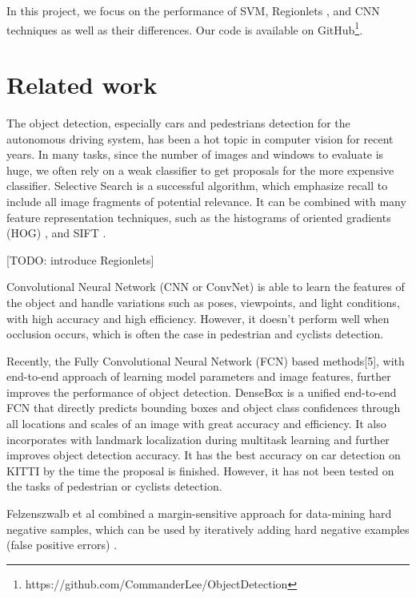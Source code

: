 \documentclass{article} %
\begin{document}
In this project, we focus on the performance of SVM, Regionlets \cite{Wang2013}, and CNN techniques as well as their differences. Our code is available on GitHub\footnote{https://github.com/CommanderLee/ObjectDetection}.


\section{Related work}

The object detection, especially cars and pedestrians detection for the autonomous driving system, has been a hot topic in computer vision for recent years. In many tasks, since the number of images and windows to evaluate is huge, we often rely on a weak classifier to get proposals for the more expensive classifier. Selective Search \cite{van2011segmentation} is a successful algorithm, which emphasize recall to include all image fragments of potential relevance. It can be combined with many feature representation techniques, such as the histograms of oriented gradients (HOG) \cite{dalal2005histograms}, and SIFT \cite{lowe2004distinctive}. 

[TODO: introduce Regionlets]

Convolutional Neural Network (CNN or ConvNet) \cite{Krizhevsky2012} is able to learn the features of the object and handle variations such as poses, viewpoints, and light conditions, with high accuracy and high efficiency. However, it doesn't perform well when occlusion occurs, which is often the case in pedestrian and cyclists detection. 

Recently, the Fully Convolutional Neural Network (FCN) based methods[5], with end-to-end approach of learning model parameters and image features, further improves the performance of object detection. DenseBox \cite{Huang2015} is a unified end-to-end FCN that
directly predicts bounding boxes and object class confidences through all locations
and scales of an image with great accuracy and efficiency. It also incorporates with landmark localization during multitask learning and further improves
object detection accuracy. It has the best accuracy on car detection on KITTI by the time the proposal is finished. However, it has not been tested on the tasks of pedestrian or cyclists detection.

Felzenszwalb et al \cite{felzenszwalb2010object} combined a margin-sensitive approach for data-mining hard negative samples, which can be used by iteratively adding hard negative examples (false positive errors) \cite{van2011segmentation}.
\end{document}
